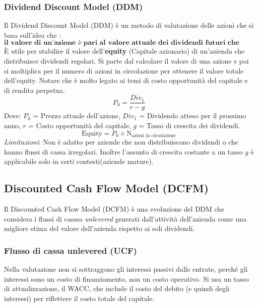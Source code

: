 \documentclass[a4paper,10pt]{article}
\begin{document}
\subsubsection{Dividend Discount Model (DDM)}
Il Dividend Discount Model (DDM) è un metodo di valutazione delle azioni che si basa sull'idea che :
\[\textbf{il valore di un'azione è pari al valore attuale dei dividendi futuri che l'azione genererà}\]
È utile per stabilire il valore dell'\textbf{equity} (Capitale azionario) di un'azienda che distribuisce dividendi regolari.
Si parte dal calcolare il valore di una azione e poi si moltiplica per il numero di azioni in circolazione per ottenere il valore totale dell'equity.
Notare che è molto legato ai temi di costo opportunità del capitale e di rendita perpetua.
\[
    P_0 = \frac{Div_1}{r-g}
\]
Dove: $P_0$ = Prezzo attuale dell'azione, $Div_1$ = Dividendo atteso per il prossimo anno, $r$ = Costo opportunità del capitale, $g$ = Tasso di crescita dei dividendi.
\[
    \text{Equity} = P_0 \times \text{N}_{\text{azioni in circolazione}}
\]
\textit{Limitazioni}: 
Non è adatto per aziende che non distribuiscono dividendi o che hanno flussi di cassa irregolari. Inoltre l'assunto di crescita costante a un tasso $g$ è applicabile solo in certi contesti(aziende mature).

\subsection{Discounted Cash Flow Model (DCFM)}
Il Discounted Cash Flow Model (DCFM) è una evoluzione del DDM che considera i flussi di casssa \textit{unlevered} generati dall'attività dell'azienda come una migliore stima del valore dell'azienda rispetto ai soli dividendi.
\subsubsection{Flusso di cassa unlevered (UCF)}
Nella valutazione non si sottraggono gli interessi passivi dalle entrate, perché gli interessi sono un costo di finanziamento, non un costo operativo. 
Si usa un tasso di attualizzazione, il WACC, che include il costo del debito (e quindi degli interessi) per riflettere il costo totale del capitale.
\end{document}
